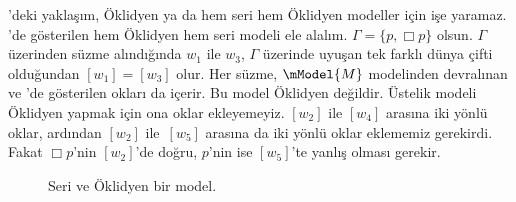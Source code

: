 



'deki yaklaşım, Öklidyen ya da hem seri hem Öklidyen
modeller için işe yaramaz. 'de gösterilen hem
Öklidyen hem seri modeli ele alalım. $\Gamma=\{p,\Box p\}$ olsun.
$\Gamma$ üzerinden süzme alındığında $w_1$ ile $w_3$, $\Gamma$ üzerinde
uyuşan tek farklı dünya çifti olduğundan $[w_1]=[w_3]$ olur. Her süzme,
$\mModel{M}$ modelinden devralınan ve 'de gösterilen
okları da içerir. Bu model Öklidyen değildir. Üstelik modeli Öklidyen yapmak
için ona oklar ekleyemeyiz. $[w_2]$ ile $[w_4]$ arasına iki yönlü oklar,
ardından $[w_2]$ ile~$[w_5]$ arasına da iki yönlü oklar eklememiz gerekirdi.
Fakat $\Box p$'nin $[w_2]$'de doğru, $p$'nin ise $[w_5]$'te yanlış olması
gerekir.

\begin{figure}[htpb]
  \centering
  \caption{Seri ve Öklidyen bir model.}
\end{figure}

